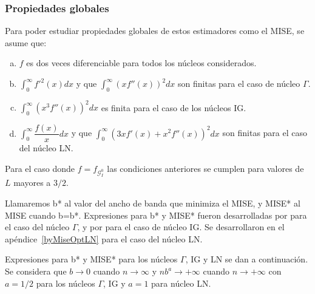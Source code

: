 \subsubsection{Propiedades globales}
\label{PropiedadesGlobales}

Para poder estudiar propiedades globales de estos estimadores como el MISE, se asume que:
\begin{enumerate}[a)]
	\label{CondPropGlobales}
	\item $f$ es dos veces diferenciable para todos los núcleos considerados.
	\item $\displaystyle{\int_0^{\infty}}  f'^2(x) dx$ y que $\displaystyle{\int_0^{\infty}}  (x f''(x))^2 dx$ son finitas para el caso de núcleo $\Gamma$.
	\item $\displaystyle{\int_0^{\infty}}  (x^3 f''(x))^2 dx$ es finita para el caso de los núcleos IG.
	\item $\displaystyle{\int_0^{\infty}}  \dfrac{f(x)}{x} dx$ y que $\displaystyle{\int_0^{\infty}}  (3 x f'(x)+x^2 f''(x))^2 dx$ son finitas para el caso del núcleo LN.
\end{enumerate}
Para el caso donde $f=f_{\mathcal{G}_I^0}$ las condiciones anteriores se cumplen para valores de $L$ mayores a $3/2$.

Llamaremos b* al valor del ancho de banda que minimiza el MISE, y MISE* al MISE cuando b=b*. Expresiones para b* y MISE* fueron desarrolladas por \citet{chensx2000} para el caso del núcleo $\Gamma$, y por \citet{Scaillet2004} para el caso de núcleo IG.
Se desarrollaron en el apéndice~\ref{byMiseOptLN} para el caso del núcleo LN. 

Expresiones para b* y MISE* para los núcleos $\Gamma$, IG y LN  se dan a continuación. Se considera que $b \to 0$ cuando $n \to \infty$ y $n b^a \to +\infty$ cuando $n \to +\infty$ con $a=1/2$ para los núcleos $\Gamma$, IG y $a=1$ para núcleo LN.

